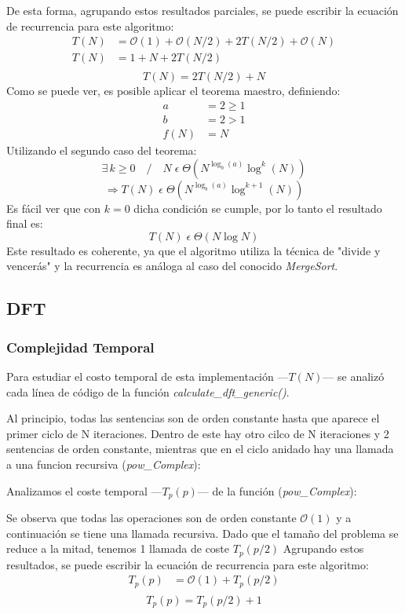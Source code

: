 \documentclass{article}
\begin{document}
      De esta forma, agrupando estos resultados parciales, se puede escribir la
     ecuación de recurrencia para este algoritmo:
    \begin{align*}
      T(N) &= \mathcal{O}(1) + \mathcal{O}(N/2) + 2T(N/2) + \mathcal{O}(N) \\
      T(N) &= 1 + N + 2T(N/2) \\
    \end{align*}
    \begin{equation*}
      \boxed{T(N) = 2T(N/2) + N}
    \end{equation*}
      Como se puede ver, es posible aplicar el teorema maestro, definiendo:
    \begin{align*}
      a &= 2 \geq 1 \\
      b &= 2 > 1\\
   f(N) &= N
    \end{align*}
      Utilizando el segundo caso del teorema:
    $$ \exists\,k \geq 0 \quad / \quad N \;\epsilon\; \Theta (N^{\log_b (a)} \log^k (N)) $$
    $$ \Rightarrow T(N)\;\epsilon\;\Theta (N^{\log_b (a)} \log^{k+1} (N)) $$
      Es fácil ver que con $k=0$ dicha condición se cumple, por lo tanto
    el resultado final es:
    $$ \boxed{T(N)\;\epsilon\;\Theta (N \log N)} $$
      Este resultado es coherente, ya que el algoritmo utiliza la técnica de 
    "divide y vencerás" y la recurrencia es análoga al caso del conocido 
    \textit{MergeSort}.
    
    \subsection{DFT}
    \subsubsection{Complejidad Temporal}
      Para estudiar el costo temporal de esta implementación ---$T(N)$--- se analizó
    cada línea de código de la función \textit{calculate\_dft\_generic()}.\par
    Al principio, todas las sentencias son de orden constante hasta que
    aparece el primer ciclo de N iteraciones. Dentro de este hay otro cilco de N 
  iteraciones y 2 sentencias de orden constante, mientras que en el ciclo anidado 
  hay una llamada a una funcion recursiva (\textit{pow\_Complex}):
  
  Analizamos el coste temporal ---$T_p(p)$--- de la función (\textit{pow\_Complex}):
  
    Se observa que todas las operaciones son de orden constante $\mathcal{O}(1)$ 
    y a continuación se tiene una llamada recursiva. Dado que el tamaño del problema se reduce 
    a la mitad, tenemos 1 llamada de coste $T_p(p/2)$
    Agrupando estos resultados, se puede escribir la
      ecuación de recurrencia para este algoritmo:
    \begin{align*}
      T_p(p) &= \mathcal{O}(1) + T_p(p/2)\\
  \end{align*}
      \begin{equation*}
        \boxed{T_p(p) = T_p(p/2) + 1}
      \end{equation*}
    
\end{document}
